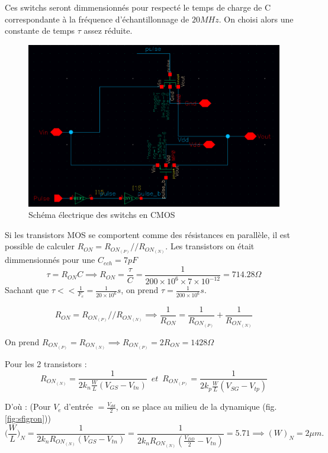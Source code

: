 \documentclass[11pt]{article}
\begin{document}
Ces switchs seront dimmensionn\'es pour respect\'e le temps de charge de C
correspondante \`a la fr\'equence d'\'echantillonnage de $20 MHz$. On choisi alors
une constante de temps $\tau$ assez r\'eduite.

\begin{figure}[!htb]
\begin{center}
  \includegraphics[width=0.8\linewidth]{switchs_.png}
  \caption{Sch\'ema \'electrique des switchs en CMOS}
\end{center}
\end{figure}



\clearpage

Si les transistors MOS se comportent comme des r\'esistances en parall\`ele,
il est possible de calculer $R_{ON} = R_{ON_{(P)}}//R_{ON_{(N)}}$.
Les transistors on \'etait dimmensionn\'es pour une $C_{ech} = 7 pF$
\[
  \tau = R_{ON} C \implies R_{ON} = \frac{\tau}{C} = \frac{1}{200\times10^{6}\times7\times10^{-12}} = 714.28 \Omega
\]
Sachant que $\tau << \frac{1}{F_e} = \frac{1}{20\times10^6} s$, on prend $\tau = \frac{1}{200 \times 10^6} s$.

\[
  R_{ON} = R_{ON_{(P)}}//R_{ON_{(N)}} \implies \frac{1}{R_{ON}} = \frac{1}{ R_{ON_{(P)}}} + \frac{1}{ R_{ON_{(N)}}}
\]

On prend $  R_{ON_{(P)}} =  R_{ON_{(N)}} \implies  R_{ON_{(P)}} = 2 R_{ON} = 1428 \Omega$

Pour les 2 transistors :
\[
R_{ON_{(N)}} = \frac{1}{2k_n \frac{W}{L} (V_{GS} - V_{tn})} \phantom{2} et \phantom{2} R_{ON_{(P)}} = \frac{1}{2k_p \frac{W}{L} (V_{SG} - V_{tp})}
\]

D'o\`u : (Pour $V_{e}$ d'entr\'ee $ = \frac{V_{dd}}{2}$, on se place au milieu de la dynamique (fig.\ref{fig:sfigron}))
\[
\bigg(\frac{W}{L}\bigg)_{N} = \frac{1}{2k_n R_{ON_{(N)}}  (V_{GS} - V_{tn})} =\frac{1}{2k_n R_{ON_{(N)}}  (\frac{V_{DD}}{2} - V_{tn})} = 5.71 \implies (W)_{N} = 2 \mu m.
\]
\end{document}
